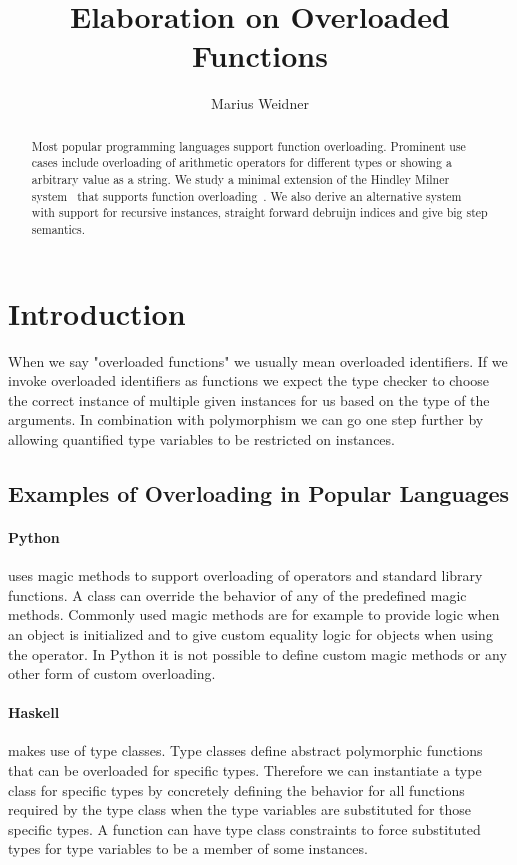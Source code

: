 \documentclass[runningheads]{llncs}
\newcommand{\snip}[1]{\footnotesize{\ttfamily{#1}}}
\begin{document}
\title{Elaboration on Overloaded Functions}
\author{Marius Weidner}
\maketitle

\begin{abstract}
Most popular programming languages support function overloading. Prominent use cases include overloading of arithmetic operators for different types or showing a arbitrary value as a string. We study a minimal extension of the Hindley Milner system~\cite{hm78} that supports function overloading~\cite{oww95}. We also derive an alternative system with support for recursive instances, straight forward debruijn indices and give big step semantics.
\end{abstract}

\section{Introduction}
When we say "overloaded functions" we usually mean overloaded identifiers. If we invoke overloaded identifiers as functions we expect the type checker to choose the correct instance of multiple given instances for us based on the type of the arguments. In combination with polymorphism we can go one step further by allowing quantified type variables to be restricted on instances. 

\subsection{Examples of Overloading in Popular Languages}
\paragraph{Python} uses magic methods to support overloading of operators and standard library functions. A class can override the behavior of any of the predefined magic methods. Commonly used magic methods are for example \snip{\_\_init\_\_(self)} to provide logic when an object is initialized and \snip{\_\_eq\_\_(self, other)} to give custom equality logic for objects when using the \snip{==} operator. In Python it is not possible to define custom magic methods or any other form of custom overloading.
\paragraph{Haskell} makes use of type classes. Type classes define abstract polymorphic functions that can be overloaded for specific types. Therefore we can instantiate a type class for specific types by concretely defining the behavior for all functions required by the type class when the type variables are substituted for those specific types. A function can have type class constraints to force substituted types for type variables to be a member of some instances. 
\end{document}
